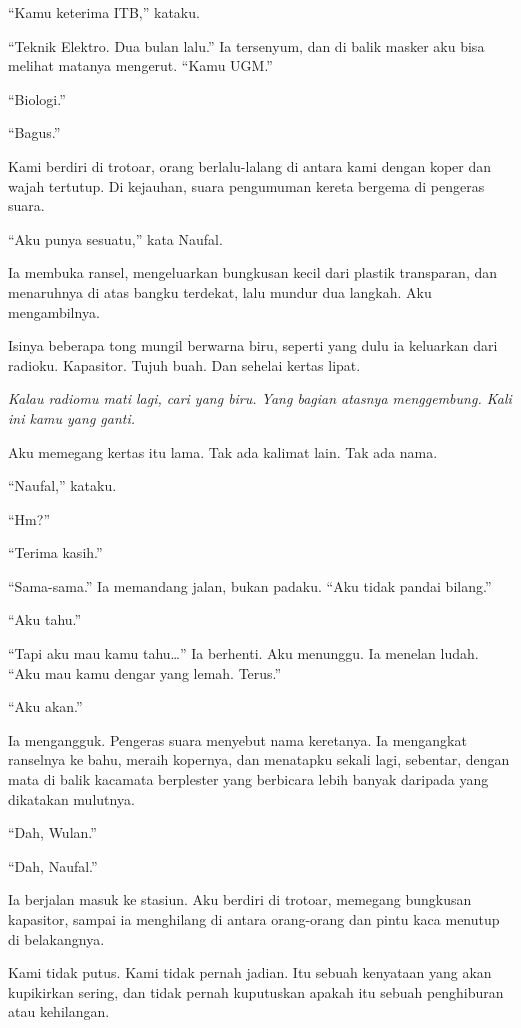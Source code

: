 \documentclass[11pt,twoside,openany]{book}
\begin{document}
``Kamu keterima ITB,'' kataku.

``Teknik Elektro. Dua bulan lalu.'' Ia tersenyum, dan di balik masker aku bisa melihat matanya mengerut. ``Kamu UGM.''

``Biologi.''

``Bagus.''

Kami berdiri di trotoar, orang berlalu-lalang di antara kami dengan koper dan wajah tertutup. Di kejauhan, suara pengumuman kereta bergema di pengeras suara.

``Aku punya sesuatu,'' kata Naufal.

Ia membuka ransel, mengeluarkan bungkusan kecil dari plastik transparan, dan menaruhnya di atas bangku terdekat, lalu mundur dua langkah. Aku mengambilnya.

Isinya beberapa tong mungil berwarna biru, seperti yang dulu ia keluarkan dari radioku. Kapasitor. Tujuh buah. Dan sehelai kertas lipat.

\emph{Kalau radiomu mati lagi, cari yang biru. Yang bagian atasnya menggembung. Kali ini kamu yang ganti.}

Aku memegang kertas itu lama. Tak ada kalimat lain. Tak ada nama.

``Naufal,'' kataku.

``Hm?''

``Terima kasih.''

``Sama-sama.'' Ia memandang jalan, bukan padaku. ``Aku tidak pandai bilang.''

``Aku tahu.''

``Tapi aku mau kamu tahu\ldots{}'' Ia berhenti. Aku menunggu. Ia menelan ludah. ``Aku mau kamu dengar yang lemah. Terus.''

``Aku akan.''

Ia mengangguk. Pengeras suara menyebut nama keretanya. Ia mengangkat ranselnya ke bahu, meraih kopernya, dan menatapku sekali lagi, sebentar, dengan mata di balik kacamata berplester yang berbicara lebih banyak daripada yang dikatakan mulutnya.

``Dah, Wulan.''

``Dah, Naufal.''

Ia berjalan masuk ke stasiun. Aku berdiri di trotoar, memegang bungkusan kapasitor, sampai ia menghilang di antara orang-orang dan pintu kaca menutup di belakangnya.

Kami tidak putus. Kami tidak pernah jadian. Itu sebuah kenyataan yang akan kupikirkan sering, dan tidak pernah kuputuskan apakah itu sebuah penghiburan atau kehilangan.
\end{document}
